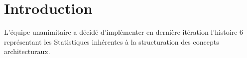 \section{Introduction}

L'équipe unanimitaire a décidé d'implémenter en dernière itération l'histoire 6
représentant les Statistiques inhérentes à la structuration des concepts
architecturaux.